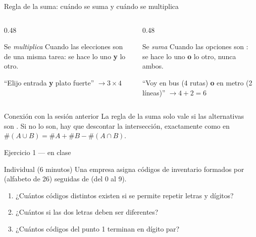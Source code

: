 \documentclass[aspectratio=169,10pt]{beamer}
\begin{document}
\begin{frame}{Regla de la suma: cuándo se suma y cuándo se multiplica}
  \begin{columns}[T,onlytextwidth]
    \begin{column}{0.48\textwidth}
      \begin{block}{Se \emph{multiplica}}
        \footnotesize
        Cuando las elecciones son  de una misma tarea:
        se hace lo uno \textbf{y} lo otro.

        \vspace{0.15cm}
        ``Elijo entrada \textbf{y} plato fuerte'' $\rightarrow 3\times 4$
      \end{block}
    \end{column}
    \begin{column}{0.48\textwidth}
      \begin{exampleblock}{Se \emph{suma}}
        \footnotesize
        Cuando las opciones son : se hace lo uno
        \textbf{o} lo otro, nunca ambos.

        \vspace{0.15cm}
        ``Voy en bus (4 rutas) \textbf{o} en metro (2 líneas)''
        $\rightarrow 4+2=6$
      \end{exampleblock}
    \end{column}
  \end{columns}

  \vspace{0.35cm}
  \begin{alertblock}{Conexión con la sesión anterior}
    \footnotesize
    La regla de la suma solo vale si las alternativas son . Si no lo son, hay que descontar la intersección, exactamente
    como en $\#(A\cup B)=\#A+\#B-\#(A\cap B)$.
  \end{alertblock}
\end{frame}

\begin{frame}{Ejercicio 1 — en clase}
  \begin{alertblock}{Individual (6 minutos)}
    Una empresa asigna códigos de inventario formados por 
    (alfabeto de 26) seguidas de  (del 0 al 9).

    \vspace{0.3cm}
    \begin{enumerate}
      \item ¿Cuántos códigos distintos existen si se permite repetir letras y
            dígitos?
      \item ¿Cuántos si las dos letras deben ser diferentes?
      \item ¿Cuántos códigos del punto 1 terminan en dígito par?
    \end{enumerate}
  \end{alertblock}
\end{frame}
\end{document}
